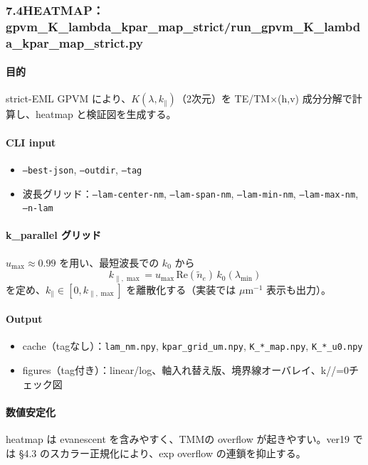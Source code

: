 \documentclass[a4paper,11pt]{jsarticle} %
\begin{document}
\subsubsection*{7.4\;HEATMAP：gpvm\_K\_lambda\_kpar\_map\_strict/run\_gpvm\_K\_lambda\_kpar\_map\_strict.py}
\paragraph{目的}
strict-EML GPVM により、$K(\lambda,k_\parallel)$（2次元）を TE/TM×(h,v) 成分分解で計算し、heatmap と検証図を生成する。

\paragraph{CLI input}
\begin{itemize}
\item \texttt{--best-json}, \texttt{--outdir}, \texttt{--tag}
\item 波長グリッド：\texttt{--lam-center-nm}, \texttt{--lam-span-nm}, \texttt{--lam-min-nm}, \texttt{--lam-max-nm}, \texttt{--n-lam}
\end{itemize}

\paragraph{k\_parallel グリッド}
$u_{\max}\approx 0.99$ を用い、最短波長での $k_0$ から
\[
k_{\parallel,\max}=u_{\max}\,\mathrm{Re}(\tilde n_e)\,k_0(\lambda_{\min})
\]
を定め、$k_\parallel\in[0,k_{\parallel,\max}]$ を離散化する（実装では $\mu\mathrm{m}^{-1}$ 表示も出力）。

\paragraph{Output}
\begin{itemize}
\item cache（tagなし）：\texttt{lam\_nm.npy}, \texttt{kpar\_grid\_um.npy}, \texttt{K\_*\_map.npy}, \texttt{K\_*\_u0.npy}
\item figures（tag付き）：linear/log、軸入れ替え版、境界線オーバレイ、k//=0チェック図
\end{itemize}

\paragraph{数値安定化}
heatmap は evanescent を含みやすく、TMMの overflow が起きやすい。ver19 では \S4.3 のスカラー正規化により、exp overflow の連鎖を抑止する。
\end{document}
